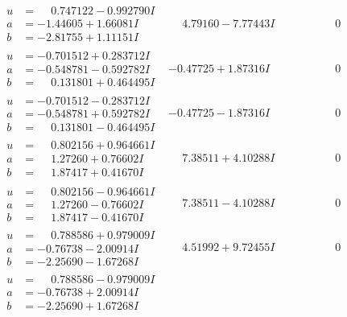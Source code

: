\documentclass[1p]{elsarticle_modified}
\theoremstyle{definition}
\begin{document}
$$\begin{array}{c|c|c}
\begin{aligned}
u &= \phantom{-}0.747122 - 0.992790 I \\
a &= -1.44605 + 1.66081 I \\
b &= -2.81755 + 1.11151 I\end{aligned}
 & \phantom{-}4.79160 - 7.77443 I & \phantom{-0.000000 } 0 \\ \hline\begin{aligned}
u &= -0.701512 + 0.283712 I \\
a &= -0.548781 - 0.592782 I \\
b &= \phantom{-}0.131801 + 0.464495 I\end{aligned}
 & -0.47725 + 1.87316 I & \phantom{-0.000000 } 0 \\ \hline\begin{aligned}
u &= -0.701512 - 0.283712 I \\
a &= -0.548781 + 0.592782 I \\
b &= \phantom{-}0.131801 - 0.464495 I\end{aligned}
 & -0.47725 - 1.87316 I & \phantom{-0.000000 } 0 \\ \hline\begin{aligned}
u &= \phantom{-}0.802156 + 0.964661 I \\
a &= \phantom{-}1.27260 + 0.76602 I \\
b &= \phantom{-}1.87417 + 0.41670 I\end{aligned}
 & \phantom{-}7.38511 + 4.10288 I & \phantom{-0.000000 } 0 \\ \hline\begin{aligned}
u &= \phantom{-}0.802156 - 0.964661 I \\
a &= \phantom{-}1.27260 - 0.76602 I \\
b &= \phantom{-}1.87417 - 0.41670 I\end{aligned}
 & \phantom{-}7.38511 - 4.10288 I & \phantom{-0.000000 } 0 \\ \hline\begin{aligned}
u &= \phantom{-}0.788586 + 0.979009 I \\
a &= -0.76738 - 2.00914 I \\
b &= -2.25690 - 1.67268 I\end{aligned}
 & \phantom{-}4.51992 + 9.72455 I & \phantom{-0.000000 } 0 \\ \hline\begin{aligned}
u &= \phantom{-}0.788586 - 0.979009 I \\
a &= -0.76738 + 2.00914 I \\
b &= -2.25690 + 1.67268 I\end{aligned}

\end{array}$$
\end{document}
